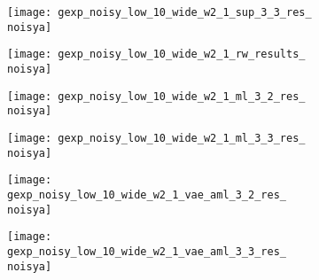 \begin{figure*}[t]
{\begin{subfigure}[t]{1\textwidth}
\begin{subfigure}[t]{0.095\textwidth}
            \texttt{[image: gexp\_noisy\_low\_10\_wide\_w2\_1\_sup\_3\_3\_res\_\\noisya]}
        \end{subfigure}
        \begin{subfigure}[t]{0.095\textwidth}
        	\vspace{0px}\centering
        	\texttt{[image: gexp\_noisy\_low\_10\_wide\_w2\_1\_rw\_results\_\\noisya]}
        \end{subfigure}
        \begin{subfigure}[t]{0.095\textwidth}
            \vspace{0px}\centering
            \texttt{[image: gexp\_noisy\_low\_10\_wide\_w2\_1\_ml\_3\_2\_res\_\\noisya]}
        \end{subfigure}
        \begin{subfigure}[t]{0.095\textwidth}
            \vspace{0px}\centering
            \texttt{[image: gexp\_noisy\_low\_10\_wide\_w2\_1\_ml\_3\_3\_res\_\\noisya]}
        \end{subfigure}
        \begin{subfigure}[t]{0.095\textwidth}
        	\vspace{0px}\centering
        	\texttt{[image: gexp\_noisy\_low\_10\_wide\_w2\_1\_vae\_aml\_3\_2\_res\_\\noisya]}
        \end{subfigure}
        \begin{subfigure}[t]{0.095\textwidth}
        	\vspace{0px}\centering
        	\texttt{[image: gexp\_noisy\_low\_10\_wide\_w2\_1\_vae\_aml\_3\_3\_res\_\\noisya]}
        \end{subfigure}
        \begin{subfigure}[t]{0.095\textwidth}
        	\vspace{0px}\centering

\end{subfigure}
\end{subfigure}}
\end{figure*}

